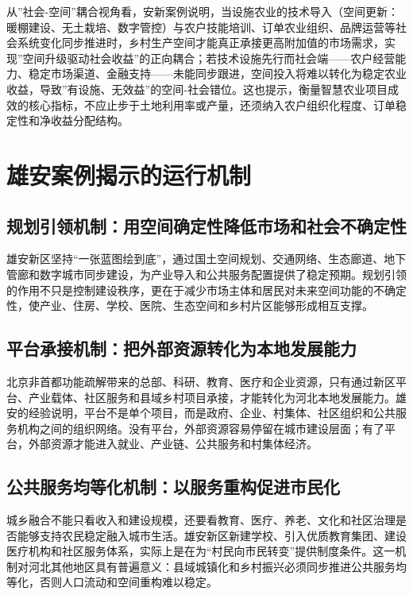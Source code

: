 \documentclass[UTF8,zihao=-4]{ctexart}
\begin{document}
从”社会-空间”耦合视角看，安新案例说明，当设施农业的技术导入（空间更新：暖棚建设、无土栽培、数字管控）与农户技能培训、订单农业组织、品牌运营等社会系统变化同步推进时，乡村生产空间才能真正承接更高附加值的市场需求，实现”空间升级驱动社会收益”的正向耦合；若技术设施先行而社会端——农户经营能力、稳定市场渠道、金融支持——未能同步跟进，空间投入将难以转化为稳定农业收益，导致”有设施、无效益”的空间-社会错位。这也提示，衡量智慧农业项目成效的核心指标，不应止步于土地利用率或产量，还须纳入农户组织化程度、订单稳定性和净收益分配结构。

\section{雄安案例揭示的运行机制}

\subsection{规划引领机制：用空间确定性降低市场和社会不确定性}

雄安新区坚持“一张蓝图绘到底”，通过国土空间规划、交通网络、生态廊道、地下管廊和数字城市同步建设，为产业导入和公共服务配置提供了稳定预期。规划引领的作用不只是控制建设秩序，更在于减少市场主体和居民对未来空间功能的不确定性，使产业、住房、学校、医院、生态空间和乡村片区能够形成相互支撑。

\subsection{平台承接机制：把外部资源转化为本地发展能力}

北京非首都功能疏解带来的总部、科研、教育、医疗和企业资源，只有通过新区平台、产业载体、社区服务和县域乡村项目承接，才能转化为河北本地发展能力。雄安的经验说明，平台不是单个项目，而是政府、企业、村集体、社区组织和公共服务机构之间的组织网络。没有平台，外部资源容易停留在城市建设层面；有了平台，外部资源才能进入就业、产业链、公共服务和村集体经济。

\subsection{公共服务均等化机制：以服务重构促进市民化}

城乡融合不能只看收入和建设规模，还要看教育、医疗、养老、文化和社区治理是否能够支持农民稳定融入城市生活。雄安新区新建学校、引入优质教育集团、建设医疗机构和社区服务体系，实际上是在为“村民向市民转变”提供制度条件。这一机制对河北其他地区具有普遍意义：县域城镇化和乡村振兴必须同步推进公共服务均等化，否则人口流动和空间重构难以稳定。
\end{document}
